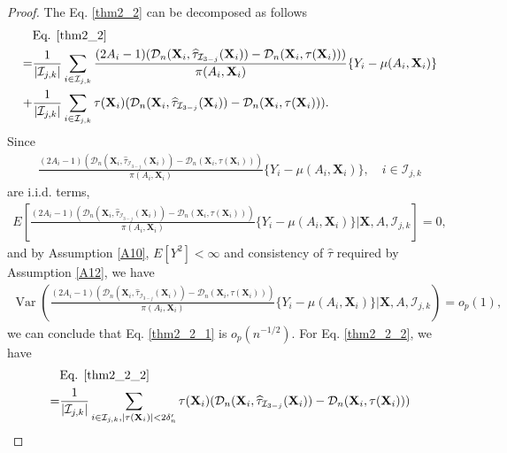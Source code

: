 \documentclass[11pt]{article}
\theoremstyle{referenceplain}
\theoremstyle{referencedefinition}
\theoremstyle{referenceremark}
\begin{document}
\begin{proof}
    The Eq. \eqref{thm2_2} can be decomposed as follows
    \begin{align}
        &\text{Eq. }\eqref{thm2_2}\notag\\
        =&\frac{1}{|\mathcal{I}_{j,k}|}\sum_{i\in\mathcal{I}_{j,k}}\frac{(2A_i-1)(\mathcal{D}_n(\mathbf{X}_i,\widehat{\tau}_{\mathcal{I}_{3-j}}(\mathbf{X}_i))-\mathcal{D}_n(\mathbf{X}_i,\tau(\mathbf{X}_i)))}{\pi(A_i,\mathbf{X}_i)}\{Y_i-\mu(A_i,\mathbf{X}_i)\}\label{thm2_2_1}\\
         +&\frac{1}{|\mathcal{I}_{j,k}|}\sum_{i\in\mathcal{I}_{j,k}}\tau(\mathbf{X}_i)(\mathcal{D}_n(\mathbf{X}_i,\widehat{\tau}_{\mathcal{I}_{3-j}}(\mathbf{X}_i))-\mathcal{D}_n(\mathbf{X}_i,\tau(\mathbf{X}_i))).\label{thm2_2_2}
    \end{align}
    Since 
    \begin{align*}
        \frac{(2A_i-1)(\mathcal{D}_n(\mathbf{X}_i,\widehat{\tau}_{\mathcal{I}_{3-j}}(\mathbf{X}_i))-\mathcal{D}_n(\mathbf{X}_i,\tau(\mathbf{X}_i)))}{\pi(A_i,\mathbf{X}_i)}\{Y_i-\mu(A_i,\mathbf{X}_i)\}, \quad i\in\mathcal{I}_{j,k}
    \end{align*}
 are i.i.d. terms, 
    \begin{align*}
        E\left[\frac{(2A_i-1)(\mathcal{D}_n(\mathbf{X}_i,\widehat{\tau}_{\mathcal{I}_{3-j}}(\mathbf{X}_i))-\mathcal{D}_n(\mathbf{X}_i,\tau(\mathbf{X}_i)))}{\pi(A_i,\mathbf{X}_i)}\{Y_i-\mu(A_i,\mathbf{X}_i)\}\bigg|\mathbf{X},A,\mathcal{I}_{j,k}\right]=0,
    \end{align*}
    and by Assumption \ref{A10}, $E[Y^2]<\infty$ and consistency of $\widehat{\tau}$ required by Assumption \ref{A12}, we have
    \begin{align*}
        \operatorname{Var}\left(\frac{(2A_i-1)(\mathcal{D}_n(\mathbf{X}_i,\widehat{\tau}_{\mathcal{I}_{3-j}}(\mathbf{X}_i))-\mathcal{D}_n(\mathbf{X}_i,\tau(\mathbf{X}_i)))}{\pi(A_i,\mathbf{X}_i)}\{Y_i-\mu(A_i,\mathbf{X}_i)\}\bigg|\mathbf{X},A,\mathcal{I}_{j,k}\right)=o_p(1),
    \end{align*}
    we can conclude that Eq. \eqref{thm2_2_1} is $o_p(n^{-1/2})$. For Eq. \eqref{thm2_2_2}, we have
    \begin{align}
        &\text{Eq. }\eqref{thm2_2_2}\notag\\
        =&\frac{1}{|\mathcal{I}_{j,k}|}\sum_{i\in\mathcal{I}_{j,k},|\tau(\mathbf{X}_i)|<2\delta_n'}\tau(\mathbf{X}_i)(\mathcal{D}_n(\mathbf{X}_i,\widehat{\tau}_{\mathcal{I}_{3-j}}(\mathbf{X}_i))-\mathcal{D}_n(\mathbf{X}_i,\tau(\mathbf{X}_i)))\label{thm2_2_3}\\

\end{align}
\end{proof}
\end{document}
